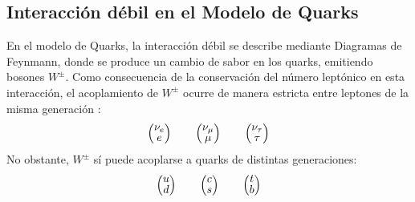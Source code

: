 \subsection{Interacción débil en el Modelo de Quarks}\label{sec:weak_int_quarks}
En el modelo de Quarks, la interacción débil se describe  mediante Diagramas de Feynmann, donde se produce un cambio de sabor en los quarks, emitiendo bosones $W^{\pm}$. Como consecuencia de la conservación del número leptónico en esta interacción, el acoplamiento de $W^{\pm}$ ocurre de manera estricta entre leptones de la misma generación \cite{Griffiths2008}: 
\begin{align}
\begingroup 
\renewcommand*{\arraystretch}{0.8}
\setlength\arraycolsep{10pt}
\begin{pmatrix} \nu _{e} \\ e \end{pmatrix} \qquad
\begin{pmatrix} \nu _{\mu } \\ \mu \end{pmatrix} \qquad
\begin{pmatrix} \nu_{\tau} \\ \tau \end{pmatrix}
\endgroup
\end{align}
No obstante, $W^{\pm}$ sí puede acoplarse a quarks de distintas generaciones:
\begin{align}
\begingroup 
\renewcommand*{\arraystretch}{0.8}
\setlength\arraycolsep{10pt}
\begin{pmatrix} u \\ d \end{pmatrix} \qquad
\begin{pmatrix} c \\ s \end{pmatrix} \qquad
\begin{pmatrix} t \\ b \end{pmatrix}
\endgroup
\end{align}


